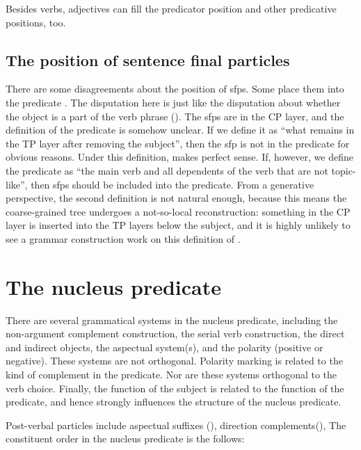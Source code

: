 \documentclass[../main.tex]{subfiles}
\begin{document}
Besides verbs, adjectives can fill the predicator position and other predicative positions, too.  %

\subsection{The position of sentence final particles}

There are some disagreements about the position of \ac{sfp}s. 
Some place them into the predicate \citep[]{zhudexigrammar}. 
The disputation here is just like the disputation about whether the object is a part of the verb phrase 
().
The \ac{sfp}s are in the CP layer, and the definition of the predicate is somehow unclear.
If we define it as ``what remains in the TP layer after removing the subject'',
then the \ac{sfp} is not in the predicate for obvious reasons.
Under this definition,  makes perfect sense.
If, however, we define the predicate as 
``the main verb and all dependents of the verb that are not topic-like'',
then \ac{sfp}s should be included into the predicate.
From a generative perspective, the second definition is not natural enough,
because this means the coarse-grained tree undergoes a not-so-local reconstruction: 
something in the CP layer is inserted into the TP layers below the subject,
and it is highly unlikely to see a grammar construction work on this definition of .

\section{The nucleus predicate}


There are several grammatical systems in the nucleus predicate, including 
the non-argument complement construction,
the serial verb construction,
the direct and indirect objects,
the aspectual system(s),
and the polarity (positive or negative). 
These systems are not orthogonal. Polarity marking is related to the kind of complement in the predicate.
Nor are these systems orthogonal to the verb choice. 
Finally, the function of the subject is related to the function of the predicate,
and hence strongly influences the structure of the nucleus predicate. %

Post-verbal particles include aspectual suffixes (),
direction complements(), %
The constituent order in the nucleus predicate is the follows:
\begin{exe}
    \ex 
\end{exe}
\end{document}
